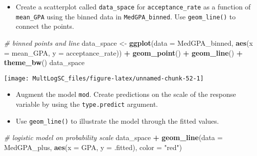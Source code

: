 \documentclass[]{book}
\newenvironment{Shaded}{\begin{snugshade}}{\end{snugshade}}
\newcommand{\KeywordTok}[1]{\textcolor[rgb]{0.13,0.29,0.53}{\textbf{#1}}}
\newcommand{\DataTypeTok}[1]{\textcolor[rgb]{0.13,0.29,0.53}{#1}}
\newcommand{\StringTok}[1]{\textcolor[rgb]{0.31,0.60,0.02}{#1}}
\newcommand{\CommentTok}[1]{\textcolor[rgb]{0.56,0.35,0.01}{\textit{#1}}}
\newcommand{\OperatorTok}[1]{\textcolor[rgb]{0.81,0.36,0.00}{\textbf{#1}}}
\newcommand{\NormalTok}[1]{#1}
\providecommand{\tightlist}{%
  \setlength{\itemsep}{0pt}\setlength{\parskip}{0pt}}
\begin{document}
\begin{itemize}
\tightlist
\item
  Create a scatterplot called \texttt{data\_space} for
  \texttt{acceptance\_rate} as a function of \texttt{mean\_GPA} using
  the binned data in \texttt{MedGPA\_binned}. Use \texttt{geom\_line()}
  to connect the points.
\end{itemize}

\begin{Shaded}
\begin{Highlighting}[]
\CommentTok{# binned points and line}
\NormalTok{data_space <-}\StringTok{ }\KeywordTok{ggplot}\NormalTok{(}\DataTypeTok{data =}\NormalTok{ MedGPA_binned, }\KeywordTok{aes}\NormalTok{(}\DataTypeTok{x =}\NormalTok{ mean_GPA, }\DataTypeTok{y =}\NormalTok{ acceptance_rate)) }\OperatorTok{+}
\StringTok{  }\KeywordTok{geom_point}\NormalTok{() }\OperatorTok{+}\StringTok{ }
\StringTok{  }\KeywordTok{geom_line}\NormalTok{() }\OperatorTok{+}\StringTok{ }
\StringTok{  }\KeywordTok{theme_bw}\NormalTok{()}
\NormalTok{data_space}
\end{Highlighting}
\end{Shaded}

\begin{center}\texttt{[image: MultLogSC\_files/figure-latex/unnamed-chunk-52-1]} \end{center}

\begin{itemize}
\tightlist
\item
  Augment the model \texttt{mod}. Create predictions on the scale of the
  response variable by using the \texttt{type.predict} argument.
\end{itemize}

\begin{Shaded}
\end{Shaded}

\begin{itemize}
\tightlist
\item
  Use \texttt{geom\_line()} to illustrate the model through the fitted
  values.
\end{itemize}

\begin{Shaded}
\begin{Highlighting}[]
\CommentTok{# logistic model on probability scale}
\NormalTok{data_space }\OperatorTok{+}
\StringTok{  }\KeywordTok{geom_line}\NormalTok{(}\DataTypeTok{data =}\NormalTok{ MedGPA_plus, }\KeywordTok{aes}\NormalTok{(}\DataTypeTok{x =}\NormalTok{ GPA, }\DataTypeTok{y =}\NormalTok{ .fitted), }\DataTypeTok{color =} \StringTok{"red"}\NormalTok{)}
\end{Highlighting}
\end{Shaded}
\end{document}
